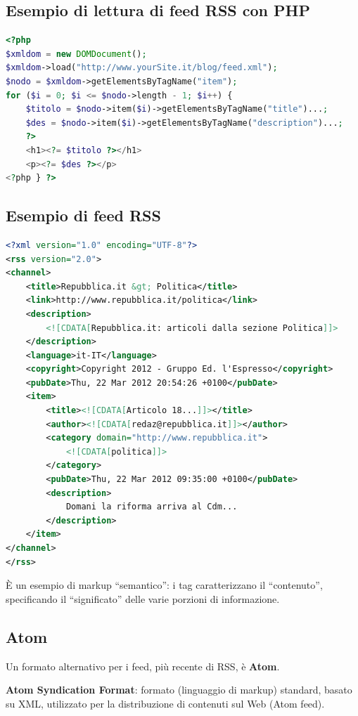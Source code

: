 \subsection{Esempio di lettura di feed RSS con PHP}

\begin{lstlisting}[language=PHP]
<?php
$xmldom = new DOMDocument();
$xmldom->load("http://www.yourSite.it/blog/feed.xml");
$nodo = $xmldom->getElementsByTagName("item");
for ($i = 0; $i <= $nodo->length - 1; $i++) {
    $titolo = $nodo->item($i)->getElementsByTagName("title")...;
    $des = $nodo->item($i)->getElementsByTagName("description")...;
    ?>
    <h1><?= $titolo ?></h1>
    <p><?= $des ?></p>
<?php } ?>
\end{lstlisting}

\subsection{Esempio di feed RSS}

\begin{lstlisting}[language=XML]
<?xml version="1.0" encoding="UTF-8"?>
<rss version="2.0">
<channel>
    <title>Repubblica.it &gt; Politica</title>
    <link>http://www.repubblica.it/politica</link>
    <description>
        <![CDATA[Repubblica.it: articoli dalla sezione Politica]]>
    </description>
    <language>it-IT</language>
    <copyright>Copyright 2012 - Gruppo Ed. l'Espresso</copyright>
    <pubDate>Thu, 22 Mar 2012 20:54:26 +0100</pubDate>
    <item>
        <title><![CDATA[Articolo 18...]]></title>
        <author><![CDATA[redaz@repubblica.it]]></author>
        <category domain="http://www.repubblica.it">
            <![CDATA[politica]]>
        </category>
        <pubDate>Thu, 22 Mar 2012 09:35:00 +0100</pubDate>
        <description>
            Domani la riforma arriva al Cdm...
        </description>
    </item>
</channel>
</rss>
\end{lstlisting}

È un esempio di markup ``semantico'': i tag caratterizzano il ``contenuto'', specificando il ``significato'' delle varie porzioni di informazione.

\subsection{Atom}

Un formato alternativo per i feed, più recente di RSS, è \textbf{Atom}.

\textbf{Atom Syndication Format}: formato (linguaggio di markup) standard, basato su XML, utilizzato per la distribuzione di contenuti sul Web (Atom feed).

